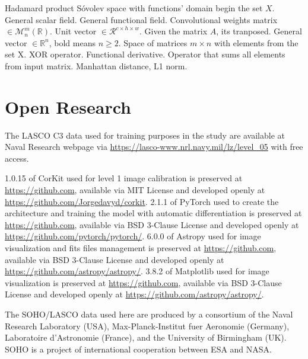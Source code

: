 \documentclass[draft]{agujournal2019}
\begin{document}
\begin{notation}
\notation{$\odot$} Hadamard product
 Sóvolev space with functions' domain begin the set $X$.
 General scalar field.
 General functional field.
 Convolutional weights matrix $ \in \mathcal{M}^{m}_{n}(\mathbb{R})$.
 Unit vector $\in \mathcal{R}^{c \times h \times w}$.
 Given the matrix $A$, its tranposed.
 General vector $\in \mathbb{R}^n$, bold means $n\ge 2$.
 Space of matrices $m \times n$ with elements from the set X.
\notation{$\xor$} XOR operator.
\notation{$\delta$} Functional derivative.
 Operator that sums all elements from input matrix.
 Manhattan distance, L1 norm.
\end{notation}


\section{Open Research}
The LASCO C3 data used for training purposes in the study are available at Naval Research webpage via \url{https://lasco-www.nrl.navy.mil/lz/level_05} with free access.

1.0.15 of CorKit used for level 1 image calibration is preserved at \url{https://github.com}, available via MIT License and developed openly at \url{https://github.com/Jorgedavyd/corkit}. 2.1.1 of PyTorch used to create the architecture and training the model with automatic differentiation is preserved at \url{https://github.com}, available via BSD 3-Clause License and developed openly at \url{https://github.com/pytorch/pytorch/}. 6.0.0 of Astropy used for image visualization and fits files management is preserved at \url{https://github.com}, available via BSD 3-Clause License and developed openly at \url{https://github.com/astropy/astropy/}. 3.8.2 of Matplotlib used for image visualization is preserved at \url{https://github.com}, available via BSD 3-Clause License and developed openly at \url{https://github.com/astropy/astropy/}.

\acknowledgments
The SOHO/LASCO data used here are produced by a consortium of the Naval Research Laboratory (USA), Max-Planck-Institut fuer Aeronomie (Germany), Laboratoire d'Astronomie (France), and the University of Birmingham (UK). SOHO is a project of international cooperation between ESA and NASA.
\end{document}
